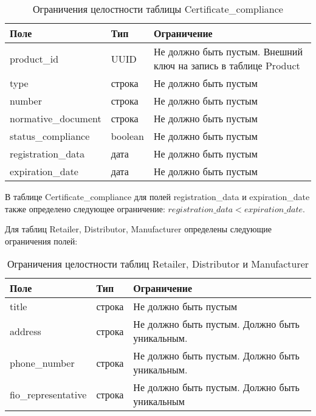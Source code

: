 \begin{table}[!h]
	\begin{center}
		\begin{threeparttable}
			\caption{Ограничения целостности таблицы Certificate\_compliance}
			\label{tbl:entity_сertificate_compliance}
			\begin{tabular}{|p{4.5cm}|p{2.5cm}|p{8.5cm}|}
				\hline 
				\textbf{Поле} & \textbf{Тип} & \textbf{Ограничение}  \\
				\hline
				product\_id & UUID & Не должно быть пустым. Внешний ключ на запись в таблице Product  \\
				\hline
				type & строка & Не должно быть пустым  \\
				\hline
				number & строка & Не должно быть пустым  \\
				\hline
				normative\_document & строка & Не должно быть пустым  \\
				\hline
				status\_compliance & boolean & Не должно быть пустым  \\
				\hline
				registration\_data & дата & Не должно быть пустым  \\
				\hline
				expiration\_date & дата & Не должно быть пустым  \\
				\hline
			\end{tabular}
		\end{threeparttable}			
	\end{center}
\end{table}

В таблице Certificate\_compliance для полей registration\_data и expiration\_date также определено следующее ограничение: $ registration\_data < expiration\_date $.


Для таблиц Retailer, Distributor, Manufacturer определены следующие ограничения полей: 

\begin{table}[!h]
	\begin{center}
		\begin{threeparttable}
			\caption{Ограничения целостности таблиц Retailer, Distributor и Manufacturer}
			\label{tbl:entity_rdm}
			\begin{tabular}{|p{4.5cm}|p{2.5cm}|p{8.5cm}|}
				\hline 
				\textbf{Поле} & \textbf{Тип} & \textbf{Ограничение}  \\
				\hline
				title & строка & Не должно быть пустым   \\
				\hline
				address & строка & Не должно быть пустым. Должно быть уникальным.  \\
				\hline
				phone\_number & строка & Не должно быть пустым. Должно быть уникальным. \\
				\hline
				fio\_representative & строка & Не должно быть пустым. Должно быть уникальным \\
				\hline
			\end{tabular}
		\end{threeparttable}			
	\end{center}
\end{table}

